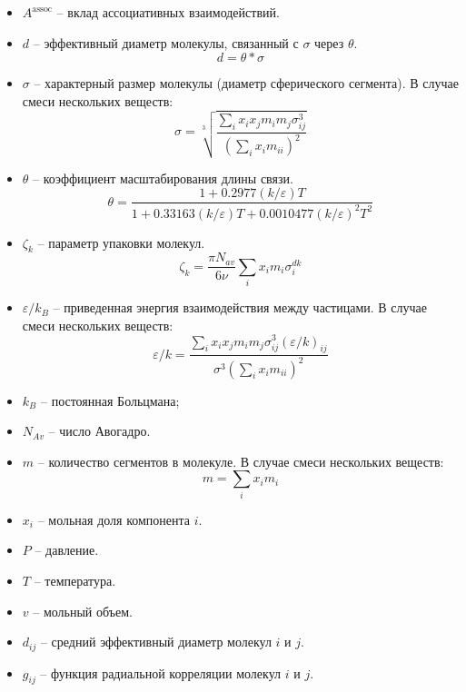 \documentclass[a4paper,12pt]{article}
\begin{document}
\begin{itemize}
        \item \( A^{\text{assoc}} \) -- вклад ассоциативных взаимодействий.
        \item $d$ -- эффективный диаметр молекулы, связанный с $\sigma$ через $\theta$.
          \[
            d = \theta * \sigma
          \]
        \item $\sigma$ -- характерный размер молекулы (диаметр сферического сегмента). В случае смеси нескольких веществ:
          \begin{equation}
            \sigma = \sqrt[3]{\frac{\sum_i x_i x_j m_i m_j \sigma_{ij}^3}{(\sum_i x_i m_{ii})^2}}
          \end{equation}
        \item $\theta$ -- коэффициент масштабирования длины связи.
          \[
          \theta = \frac{1 + 0.2977 (k / \varepsilon) T}{1 + 0.33163 (k / \varepsilon) T + 0.0010477 (k / \varepsilon)^2 T^2}
          \]
        \item $\zeta_k$ -- параметр упаковки молекул.
          \[
          \zeta_k = \frac{\pi N_{av}}{6 \nu} \sum_i x_i m_i \sigma_i^{dk}
          \]
        \item $\varepsilon / k_B$ -- приведенная энергия взаимодействия между частицами. В случае смеси нескольких веществ:
          \begin{equation}
            \varepsilon / k = \frac{\sum_i x_i x_j m_i m_j \sigma_{ij}^3 (\varepsilon / k)_{ij}}{\sigma^3 (\sum_i x_i m_{ii})^2}
          \end{equation}
        \item $k_B$ -- постоянная Больцмана;
        \item $N_{Av}$ -- число Авогадро.
        \item $m$ -- количество сегментов в молекуле. В случае смеси нескольких веществ:
          \begin{equation}
            m = \sum_i x_i m_i
          \end{equation}
        \item $x_i$ -- мольная доля компонента $i$.
        \item $P$ -- давление.
        \item $T$ -- температура.
        \item $v$ -- мольный объем.
        \item $d_{ij}$ -- средний эффективный диаметр молекул $i$ и $j$.
        \item $g_{ij}$ -- функция радиальной корреляции молекул $i$ и $j$.
          \begin{equation}

\end{equation}
\end{itemize}
\end{document}
